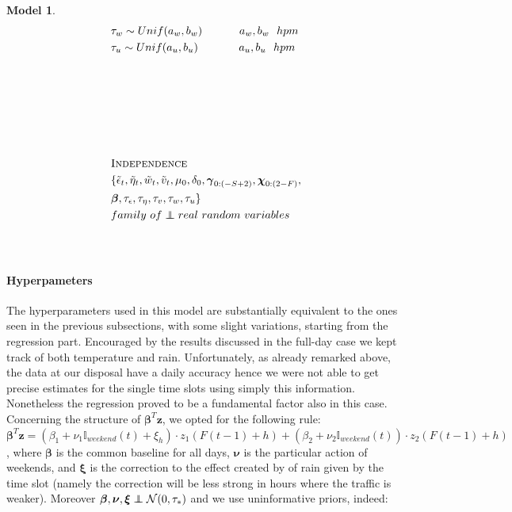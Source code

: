 \documentclass[11pt,twoside]{report}
\newcommand\independent{\protect\mathpalette{\protect\independenT}{\perp}}
\def\independenT#1#2{\mathrel{\rlap{$#1#2$}\mkern2mu{#1#2}}}
\newtheorem{model}{Model}
\begin{document}
\begin{model}
\begin{equation*}
\begin{aligned}[c]
 	&\tau_w\sim Unif(a_w, b_w)\quad\quad\quad\ a_w, b_w\ \ hpm\\
 	&\tau_u\sim Unif(a_u, b_u)\quad\quad\quad\ \ a_u, b_u\ \ hpm\\
 	&\\
 	&\\
 	&\\
 	&\\
 	&\\
 	&\\
 	&\textsc{Independence}\\
 	&\{\tilde{\epsilon}_t, \tilde{\eta}_t, \tilde{w}_t, \tilde{v}_t, \mu_0, \delta_0, \boldsymbol{\gamma}_{0:(-S+2)}, \boldsymbol{\chi}_{0:(2-F)},\\&\boldsymbol{\beta}, \tau_\epsilon, \tau_\eta, \tau_v, \tau_w, \tau_u \}\\ &family\ of \independent real\ random\ variables\\
 	&\\
 	&\\
 	\end{aligned}
 	\end{equation*}
 \end{model}

\paragraph{Hyperpameters}
The hyperparameters used in this model are substantially equivalent to the ones seen in the previous subsections, with some slight variations, starting from the regression part. Encouraged by the results discussed in the full-day case we kept track of both temperature and rain. Unfortunately, as already remarked above, the data at our disposal have a daily accuracy hence we were not able to get precise estimates for the single time slots using simply this information. Nonetheless the regression proved to be a fundamental factor also in this case. Concerning the structure of $ \boldsymbol{\beta}^T\mathbf{z} $, we opted for the following rule: $ \boldsymbol{\beta}^T\mathbf{z} = (\beta_1+\nu_1\mathbb{I}_{weekend}(t)+\xi_h)\cdot z_1(F(t-1)+h) + (\beta_2+\nu_2\mathbb{I}_{weekend}(t))\cdot z_2(F(t-1)+h)$, where $ \boldsymbol{\beta} $ is the common baseline for all days, $ \boldsymbol{\nu} $ is the particular action of weekends, and $ \boldsymbol{\xi} $ is the correction to the effect created by of rain given by the time slot (namely the correction will be less strong in hours where the traffic is weaker). Moreover $ \boldsymbol{\beta},\boldsymbol{\nu},\boldsymbol{\xi}\independent\mathcal{N}(0,\tau_*) $ and we use uninformative priors, indeed:
\end{document}
